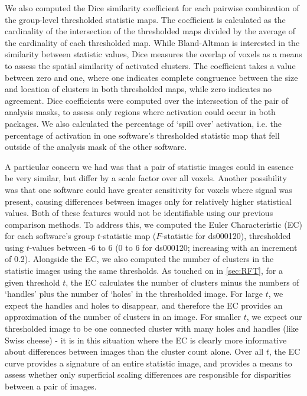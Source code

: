 We also computed the Dice similarity coefficient for each pairwise combination of the group-level thresholded statistic maps. The coefficient is calculated as the cardinality of the intersection of the thresholded maps divided by the average of the cardinality of each thresholded map. While Bland-Altman is interested in the similarity between statistic values, Dice measures the overlap of voxels as a means to assess the spatial similarity of activated clusters. The coefficient takes a value between zero and one, where one indicates complete congruence between the size and location of clusters in both thresholded maps, while zero indicates no agreement. Dice coefficients were computed over the intersection of the pair of analysis masks, to assess only regions where activation could occur in both packages. We also calculated the percentage of `spill over' activation, i.e. the percentage of activation in one software's thresholded statistic map that fell outside of the analysis mask of the other software. 

A particular concern we had was that a pair of statistic images could in essence be very similar, but differ by a scale factor over all voxels. Another possibility was that one software could have greater sensitivity for voxels where signal was present, causing differences between images only for relatively higher statistical values. Both of these features would not be identifiable using our previous comparison methods. To address this, we computed the Euler Characteristic (EC) for each software's group $t$-statistic map ($F$-statistic for ds000120), thresholded using $t$-values between -6 to 6 (0 to 6 for ds000120; increasing with an increment of 0.2). Alongside the EC, we also computed the number of clusters in the statistic images using the same thresholds. As touched on in \ref{sec:RFT}, for a given threshold $t$, the EC calculates the number of clusters minus the numbers of `handles' plus the number of `holes' in the thresholded image. For large $t$, we expect the handles and holes to disappear, and therefore the EC provides an approximation of the number of clusters in an image. For smaller $t$, we expect our thresholded image to be one connected cluster with many holes and handles (like Swiss cheese) - it is in this situation where the EC is clearly more informative about differences between images than the cluster count alone. Over all $t$, the EC curve provides a signature of an entire statistic image, and provides a means to assess whether only  superficial scaling differences are responsible for disparities between a pair of images.

